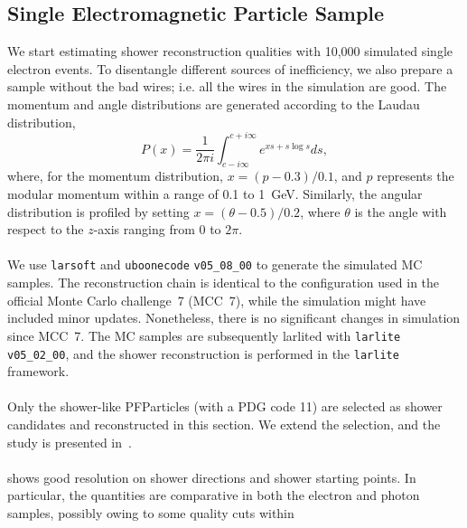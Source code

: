 \subsection{Single Electromagnetic Particle Sample}
\label{sec:single_em}

We start estimating shower reconstruction qualities with 10,000 simulated
single electron events.
To disentangle different sources of inefficiency, we also prepare a sample
without the bad wires; 
i.e. all the wires in the simulation are good.
The momentum and angle distributions are generated according to
the Laudau distribution,
\begin{equation}
\label{eq:bnb-like}
P(x) = \frac{1}{2\pi i}\int^{c+i\infty}_{c-i\infty}e^{xs+s\log s}ds,
\end{equation}
where, for the momentum distribution, $x = (p-0.3)/0.1$, and $p$ 
represents the modular momentum within a range of 0.1 to 1~GeV.
Similarly, the angular distribution is profiled by setting 
$x = (\theta-0.5)/0.2$,
where $\theta$ is the angle with respect to the $z$-axis ranging from
0 to $2\pi$. \\
\\
We use \texttt{larsoft} and \texttt{uboonecode} \texttt{v05\_08\_00} to
generate the simulated MC samples.
The reconstruction chain is identical to the configuration used in 
the official Monte Carlo challenge~7 (MCC~7), while the simulation 
might have included minor updates.
Nonetheless, there is no significant changes in simulation
since MCC~7.
The MC samples are subsequently larlited with \texttt{larlite} 
\texttt{v05\_02\_00}, and the shower reconstruction is performed in the
\texttt{larlite} framework.\\
\\
Only the shower-like PFParticles (with a PDG code 11) are selected
as shower candidates and reconstructed in this section.
We extend the selection, and the study is presented 
in~. \\
\\
 shows good resolution on 
shower directions and shower starting points.
In particular, the quantities are comparative in both the electron
and photon samples, possibly owing to some quality cuts within
